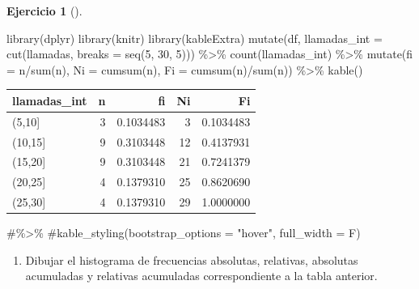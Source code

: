 \documentclass[
  a4paper,
]{scrreport}
\newenvironment{Shaded}{\begin{snugshade}}{\end{snugshade}}
\newcommand{\AttributeTok}[1]{\textcolor[rgb]{0.40,0.45,0.13}{#1}}
\newcommand{\CommentTok}[1]{\textcolor[rgb]{0.37,0.37,0.37}{#1}}
\newcommand{\DecValTok}[1]{\textcolor[rgb]{0.68,0.00,0.00}{#1}}
\newcommand{\FunctionTok}[1]{\textcolor[rgb]{0.28,0.35,0.67}{#1}}
\newcommand{\NormalTok}[1]{\textcolor[rgb]{0.00,0.23,0.31}{#1}}
\newcommand{\SpecialCharTok}[1]{\textcolor[rgb]{0.37,0.37,0.37}{#1}}
\providecommand{\tightlist}{%
  \setlength{\itemsep}{0pt}\setlength{\parskip}{0pt}}\usepackage{longtable,booktabs,array}
\theoremstyle{definition}
\newtheorem{exercise}{Ejercicio}[chapter]
\theoremstyle{remark}
\begin{document}
\begin{exercise}[]
\begin{tcolorbox}
\begin{Shaded}
\begin{Highlighting}[]
\FunctionTok{library}\NormalTok{(dplyr)}
\FunctionTok{library}\NormalTok{(knitr)}
\FunctionTok{library}\NormalTok{(kableExtra)}
\FunctionTok{mutate}\NormalTok{(df, }\AttributeTok{llamadas\_int =} \FunctionTok{cut}\NormalTok{(llamadas, }\AttributeTok{breaks =} \FunctionTok{seq}\NormalTok{(}\DecValTok{5}\NormalTok{, }\DecValTok{30}\NormalTok{, }\DecValTok{5}\NormalTok{))) }\SpecialCharTok{\%\textgreater{}\%} 
    \FunctionTok{count}\NormalTok{(llamadas\_int) }\SpecialCharTok{\%\textgreater{}\%}
    \FunctionTok{mutate}\NormalTok{(}\AttributeTok{fi =}\NormalTok{ n}\SpecialCharTok{/}\FunctionTok{sum}\NormalTok{(n), }\AttributeTok{Ni =} \FunctionTok{cumsum}\NormalTok{(n), }\AttributeTok{Fi =} \FunctionTok{cumsum}\NormalTok{(n)}\SpecialCharTok{/}\FunctionTok{sum}\NormalTok{(n)) }\SpecialCharTok{\%\textgreater{}\%}
    \FunctionTok{kable}\NormalTok{() }
\end{Highlighting}
\end{Shaded}

\begin{tabular}{l|r|r|r|r}
\hline
llamadas\_int & n & fi & Ni & Fi\\
\hline
(5,10] & 3 & 0.1034483 & 3 & 0.1034483\\
\hline
(10,15] & 9 & 0.3103448 & 12 & 0.4137931\\
\hline
(15,20] & 9 & 0.3103448 & 21 & 0.7241379\\
\hline
(20,25] & 4 & 0.1379310 & 25 & 0.8620690\\
\hline
(25,30] & 4 & 0.1379310 & 29 & 1.0000000\\
\hline
\end{tabular}

\begin{Shaded}
\begin{Highlighting}[]
    \CommentTok{\#\%\textgreater{}\%}
    \CommentTok{\#kable\_styling(bootstrap\_options = "hover", full\_width = F)}
\end{Highlighting}
\end{Shaded}

\end{tcolorbox}

\begin{enumerate}
\def\labelenumi{\alph{enumi}.}
\setcounter{enumi}{3}
\tightlist
\item
  Dibujar el histograma de frecuencias absolutas, relativas, absolutas
  acumuladas y relativas acumuladas correspondiente a la tabla anterior.
\end{enumerate}


\end{exercise}
\end{document}
